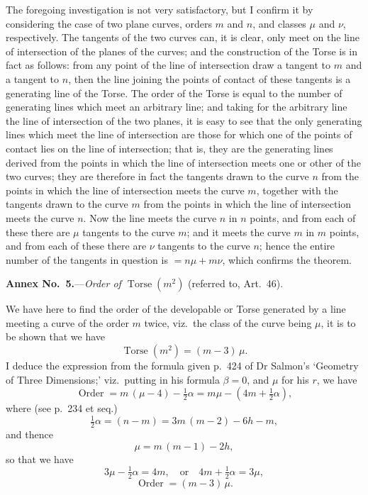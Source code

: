 \documentclass[11pt,a4paper]{article}
\providecommand{\Order}{\operatorname{Order}}
\providecommand{\Torse}{\operatorname{Torse}}
\begin{document}
The foregoing investigation is not very satisfactory, but I confirm it by considering the case of two plane curves, orders $m$ and $n$, and classes $\mu$ and $\nu$, respectively. The tangents of the two curves can, it is clear, only meet on the line of intersection of the planes of the curves; and the construction of the Torse is in fact as follows: from any point of the line of intersection draw a tangent to $m$ and a tangent to $n$, then the line joining the points of contact of these tangents is a generating line of the Torse. The order of the Torse is equal to the number of generating lines which meet an arbitrary line; and taking for the arbitrary line the line of intersection of the two planes, it is easy to see that the only generating lines which meet the line of intersection are those for which one of the points of contact lies on the line of intersection; that is, they are the generating lines derived from the points in which the line of intersection meets one or other of the two curves; they are therefore in fact the tangents drawn to the curve $n$ from the points in which the line of intersection meets the curve $m$, together with the tangents drawn to the curve $m$ from the points in which the line of intersection meets the curve $n$. Now the line meets the curve $n$ in $n$ points, and from each of these there are $\mu$ tangents to the curve $m$; and it meets the curve $m$ in $m$ points, and from each of these there are $\nu$ tangents to the curve $n$; hence the entire number of the tangents in question is $= n\mu + m\nu$, which confirms the theorem.

\bigskip

\begin{center}
\textbf{Annex No.~5.}---\textit{Order of $\Torse(m^2)$} (referred to, Art.~46).
\end{center}

We have here to find the order of the developable or Torse generated by a line meeting a curve of the order $m$ twice, viz.\ the class of the curve being $\mu$, it is to be shown that we have
\[
\Torse(m^2) = (m-3)\,\mu.
\]
I deduce the expression from the formula given p.~424 of Dr Salmon's `Geometry of Three Dimensions;' viz.\ putting in his formula $\beta = 0$, and $\mu$ for his $r$, we have
\[
\Order = m\,(\mu - 4) - \tfrac{1}{2}\alpha = m\mu - (4m + \tfrac{1}{2}\alpha),
\]
where (see p.~234 et seq.)
\[
\tfrac{1}{2}\alpha = (n - m) = 3m\,(m-2) - 6h - m,
\]
and thence
\[
\mu = m\,(m-1) - 2h,
\]
so that we have
\[
3\mu - \tfrac{1}{2}\alpha = 4m,\quad\text{or}\quad 4m + \tfrac{1}{2}\alpha = 3\mu,
\]
\[
\Order = (m-3)\,\mu.
\]
\end{document}
